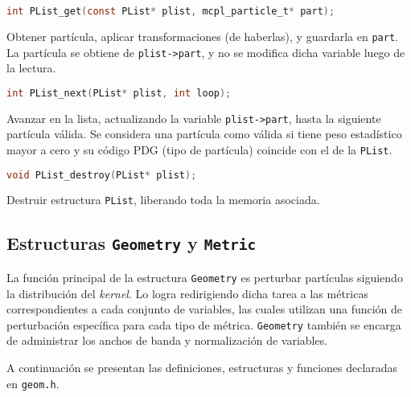 \begin{footnotesize}
\begin{lstlisting}[language=C]
int PList_get(const PList* plist, mcpl_particle_t* part);
\end{lstlisting}
\begin{addmargin}[0.5cm]{0cm}
Obtener partícula, aplicar transformaciones (de haberlas), y guardarla en \verb|part|. La partícula se obtiene de \verb|plist->part|, y no se modifica dicha variable luego de la lectura.
\end{addmargin}

\begin{lstlisting}[language=C]
int PList_next(PList* plist, int loop);
\end{lstlisting}
\begin{addmargin}[0.5cm]{0cm}
Avanzar en la lista, actualizando la variable \verb|plist->part|, hasta la siguiente partícula válida. Se considera una partícula como válida si tiene peso estadístico mayor a cero y su código PDG (tipo de partícula) coincide con el de la \verb|PList|.
\end{addmargin}

\begin{lstlisting}[language=C]
void PList_destroy(PList* plist);
\end{lstlisting}
\begin{addmargin}[0.5cm]{0cm}
Destruir estructura \verb|PList|, liberando toda la memoria asociada.
\end{addmargin}

\end{footnotesize}


\subsection{Estructuras \texttt{Geometry} y \texttt{Metric}}

La función principal de la estructura \verb|Geometry| es perturbar partículas siguiendo la distribución del \emph{kernel}. Lo logra redirigiendo dicha tarea a las métricas correspondientes a cada conjunto de variables, las cuales utilizan una función de perturbación específica para cada tipo de métrica. \verb|Geometry| también se encarga de administrar los anchos de banda y normalización de variables.

A continuación se presentan las definiciones, estructuras y funciones declaradas en \verb|geom.h|.

